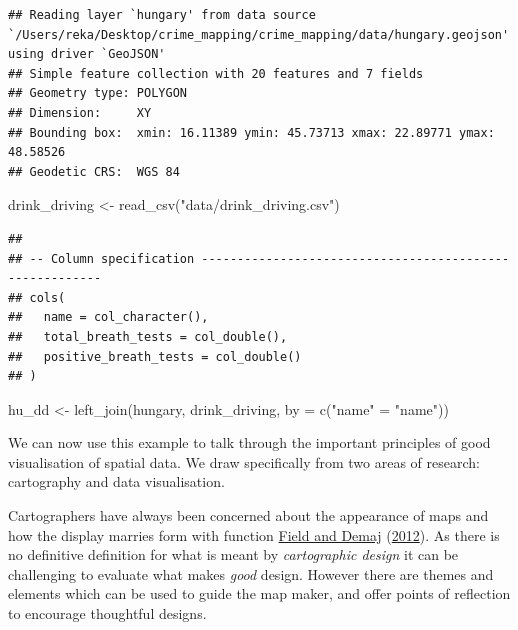 \documentclass[
]{book}
\newenvironment{Shaded}{\begin{snugshade}}{\end{snugshade}}
\newcommand{\AttributeTok}[1]{\textcolor[rgb]{0.77,0.63,0.00}{#1}}
\newcommand{\FunctionTok}[1]{\textcolor[rgb]{0.00,0.00,0.00}{#1}}
\newcommand{\NormalTok}[1]{#1}
\newcommand{\OtherTok}[1]{\textcolor[rgb]{0.56,0.35,0.01}{#1}}
\newcommand{\StringTok}[1]{\textcolor[rgb]{0.31,0.60,0.02}{#1}}
\begin{document}
\begin{verbatim}
## Reading layer `hungary' from data source `/Users/reka/Desktop/crime_mapping/crime_mapping/data/hungary.geojson' using driver `GeoJSON'
## Simple feature collection with 20 features and 7 fields
## Geometry type: POLYGON
## Dimension:     XY
## Bounding box:  xmin: 16.11389 ymin: 45.73713 xmax: 22.89771 ymax: 48.58526
## Geodetic CRS:  WGS 84
\end{verbatim}

\begin{Shaded}
\begin{Highlighting}[]
\NormalTok{drink\_driving }\OtherTok{\textless{}{-}} \FunctionTok{read\_csv}\NormalTok{(}\StringTok{"data/drink\_driving.csv"}\NormalTok{)}
\end{Highlighting}
\end{Shaded}

\begin{verbatim}
## 
## -- Column specification --------------------------------------------------------
## cols(
##   name = col_character(),
##   total_breath_tests = col_double(),
##   positive_breath_tests = col_double()
## )
\end{verbatim}

\begin{Shaded}
\begin{Highlighting}[]
\NormalTok{hu\_dd }\OtherTok{\textless{}{-}} \FunctionTok{left\_join}\NormalTok{(hungary, drink\_driving, }\AttributeTok{by =} \FunctionTok{c}\NormalTok{(}\StringTok{"name"} \OtherTok{=} \StringTok{"name"}\NormalTok{))}
\end{Highlighting}
\end{Shaded}

We can now use this example to talk through the important principles of good visualisation of spatial data. We draw specifically from two areas of research: cartography and data visualisation.

Cartographers have always been concerned about the appearance of maps and how the display marries form with function \protect\hyperlink{ref-Field_2012}{Field and Demaj} (\protect\hyperlink{ref-Field_2012}{2012}). As there is no definitive definition for what is meant by \emph{cartographic design} it can be challenging to evaluate what makes \emph{good} design. However there are themes and elements which can be used to guide the map maker, and offer points of reflection to encourage thoughtful designs.
\end{document}
